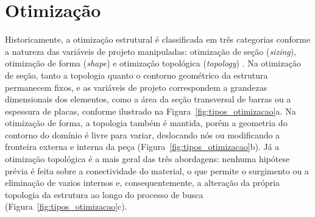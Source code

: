 \section{Otimização}\label{sec:otimizacao}

Historicamente, a otimização estrutural é classificada em três categorias conforme a natureza das variáveis de projeto manipuladas: otimização de seção (\textit{sizing}), otimização de forma (\textit{shape}) e otimização topológica (\textit{topology}) \parencite{BendsoeSigmund2003}.
Na otimização de seção, tanto a topologia quanto o contorno geométrico da estrutura permanecem fixos, e as variáveis de projeto correspondem a grandezas dimensionais dos elementos, como a área da seção transversal de barras ou a espessura de placas, conforme ilustrado na Figura~\ref{fig:tipos_otimizacao}a.
Na otimização de forma, a topologia também é mantida, porém a geometria do contorno do domínio é livre para variar, deslocando nós ou modificando a fronteira externa e interna da peça (Figura~\ref{fig:tipos_otimizacao}b).
Já a otimização topológica é a mais geral das três abordagens: nenhuma hipótese prévia é feita sobre a conectividade do material, o que permite o surgimento ou a eliminação de vazios internos e, consequentemente, a alteração da própria topologia da estrutura ao longo do processo de busca (Figura~\ref{fig:tipos_otimizacao}c).

